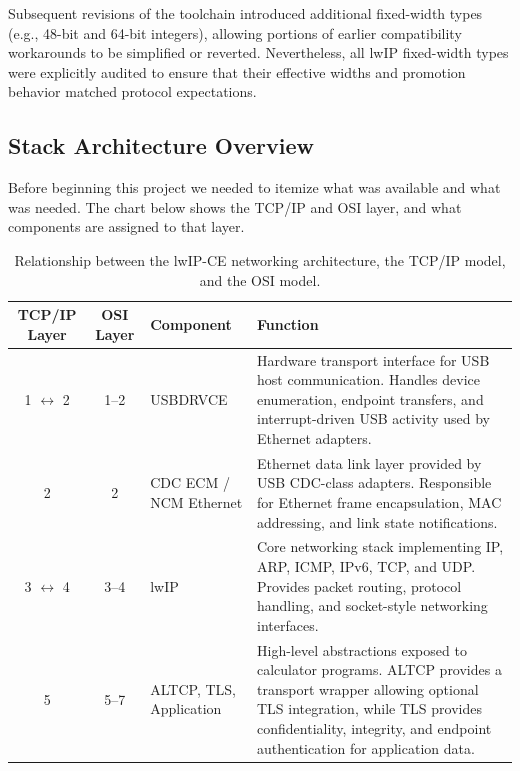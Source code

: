 \documentclass[titlepage]{report}
\begin{document}
		Subsequent revisions of the toolchain introduced additional fixed-width types (e.g., 48-bit and 64-bit integers), allowing portions of earlier compatibility workarounds to be simplified or reverted. Nevertheless, all lwIP fixed-width types were explicitly audited to ensure that their effective widths and promotion behavior matched protocol expectations.
		
		
\subsection{Stack Architecture Overview}

Before beginning this project we needed to itemize what was available and what was needed. The chart below shows the TCP/IP and OSI layer, and what components are assigned to that layer.

\begin{table}[h]
	\centering
	\begin{tabularx}{\textwidth}{C C l X}
		\toprule
		\textbf{TCP/IP Layer} & \textbf{OSI Layer} & \textbf{Component} & \textbf{Function} \\
		\midrule
		
		1 $\leftrightarrow$ 2 & 1--2 & USBDRVCE &
		Hardware transport interface for USB host communication. Handles device
		enumeration, endpoint transfers, and interrupt-driven USB activity used
		by Ethernet adapters. \\
		
		2 & 2 & CDC ECM / NCM Ethernet &
		Ethernet data link layer provided by USB CDC-class adapters. Responsible
		for Ethernet frame encapsulation, MAC addressing, and link state
		notifications. \\
		
		3 $\leftrightarrow$ 4 & 3--4 & lwIP &
		Core networking stack implementing IP, ARP, ICMP, IPv6, TCP, and UDP.
		Provides packet routing, protocol handling, and socket-style networking
		interfaces. \\
		
		5 & 5--7 & ALTCP, TLS, Application &
		High-level abstractions exposed to calculator programs. ALTCP provides a
		transport wrapper allowing optional TLS integration, while TLS provides
		confidentiality, integrity, and endpoint authentication for application
		data. \\
		
		\bottomrule
		
	\end{tabularx}
	
	\caption{Relationship between the lwIP-CE networking architecture, the TCP/IP model, and the OSI model.}
\end{table}
		
\end{document}
